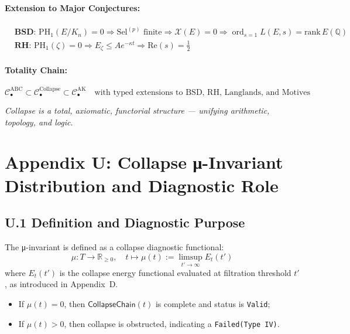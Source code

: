 \documentclass[11pt]{article}
\newcommand{\Sha}{\mathcal{X}}
\begin{document}
\paragraph{Extension to Major Conjectures:}
\[
\begin{aligned}
& \textbf{BSD: } \mathrm{PH}_1(E/K_n) = 0 \Rightarrow \mathrm{Sel}^{(p)} \text{ finite} \Rightarrow \Sha(E) = 0 \Rightarrow \operatorname{ord}_{s=1} L(E,s) = \mathrm{rank}\,E(\mathbb{Q}) \\
& \textbf{RH: } \mathrm{PH}_1(\zeta) = 0 \Rightarrow E_\zeta \leq A e^{-\kappa t} \Rightarrow \mathrm{Re}(s) = \tfrac{1}{2}
\end{aligned}
\]

\paragraph{Totality Chain:}
\[
\mathcal{C}_\bullet^{\mathrm{ABC}} \subset \mathcal{C}_\bullet^{\mathrm{Collapse}} \subset \mathcal{C}_\bullet^{\mathrm{AK}}
\quad\text{with typed extensions to BSD, RH, Langlands, and Motives}
\]

\begin{center}
\textit{Collapse is a total, axiomatic, functorial structure — unifying arithmetic, topology, and logic.}
\end{center}



\appendix
\section*{Appendix U: Collapse μ-Invariant Distribution and Diagnostic Role}

\subsection*{U.1 Definition and Diagnostic Purpose}

The μ-invariant is defined as a collapse diagnostic functional:
\[
\mu : T \longrightarrow \mathbb{R}_{\geq 0}, \quad
t \mapsto \mu(t) := \limsup_{t' \to \infty} E_t(t')
\]
where \( E_t(t') \) is the collapse energy functional evaluated at filtration threshold \( t' \),  
as introduced in Appendix~D.

\begin{itemize}
  \item If \( \mu(t) = 0 \), then \( \mathsf{CollapseChain}(t) \) is complete and status is \texttt{Valid};
  \item If \( \mu(t) > 0 \), then collapse is obstructed, indicating a \texttt{Failed(Type~IV)}.
\end{itemize}
\end{document}
